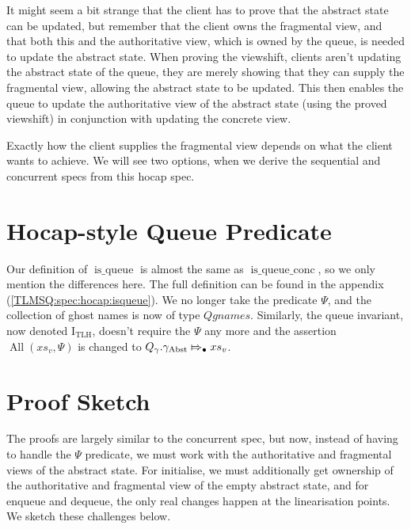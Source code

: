 \documentclass[a4paper, 10pt]{report}
\theoremstyle{definition}
\newcommand{\isqueue}{\operatorname{is\_queue}}
\newcommand{\isqueueconc}{\operatorname{is\_queue\_conc}}
\newcommand{\TLQueueInvariantHocap}{\operatorname{I_{TLH}}}
\newcommand{\Qgnames}{Qgnames}
\newcommand{\AllP}{\operatorname{All}}
\newcommand{\absvalueList}{xs_v}
\newcommand{\Qg}{Q_\gname}
\newcommand{\gabst}{\gname_{\mathrm{Abst}}}
\newcommand{\abstractstateauth}[2]{#1 \Mapsto_{\bullet} #2}
\begin{document}
It might seem a bit strange that the client has to prove that the abstract state can be updated, but remember that the client owns the fragmental view, and that both this and the authoritative view, which is owned by the queue, is needed to update the abstract state. When proving the viewshift, clients aren't updating the abstract state of the queue, they are merely showing that they can supply the fragmental view, allowing the abstract state to be updated. This then enables the queue to update the authoritative view of the abstract state (using the proved viewshift) in conjunction with updating the concrete view.

Exactly how the client supplies the fragmental view depends on what the client wants to achieve. We will see two options, when we derive the sequential and concurrent specs from this hocap spec.

\section{Hocap-style Queue Predicate}
\label{TLMSQHOCAP:section:hocap-queue-pred}
Our definition of $\isqueue$ is almost the same as $\isqueueconc$, so we only mention the differences here. The full definition can be found in the appendix (\ref{TLMSQ:spec:hocap:isqueue}). We no longer take the predicate $\Psi$, and the collection of ghost names is now of type $\Qgnames$. Similarly, the queue invariant, now denoted $\TLQueueInvariantHocap$, doesn't require the $\Psi$ any more and the assertion $\AllP(\absvalueList, \Psi)$ is changed to $\abstractstateauth{\Qg.\gabst}{\absvalueList}$.

\section{Proof Sketch}  
\label{TLMSQHOCAP:proof-Sketch}
The proofs are largely similar to the concurrent spec, but now, instead of having to handle the $\Psi$ predicate, we must work with the authoritative and fragmental views of the abstract state. For initialise, we must additionally get ownership of the authoritative and fragmental view of the empty abstract state, and for enqueue and dequeue, the only real changes happen at the linearisation points. We sketch these challenges below.
\end{document}
